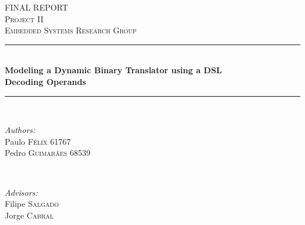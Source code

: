 \documentclass[12pt]{article}
\begin{document}
\begin{titlepage}

\newcommand{\HRule}{\rule{\linewidth}{0.5mm}} %

\center %
 

\textsc{\LARGE FINAL REPORT}\\[1.0cm] %
\textsc{\Large Project II}\\[0.5cm] %
\textsc{\large Embedded Systems Research Group}\\[0.5cm] %


\HRule \\[1.2cm]
{ \Huge \bfseries 
Modeling a Dynamic Binary Translator using a DSL}\\[1.0cm] %
{ \Large \bfseries 
Decoding Operands}\\[0.4cm]

\HRule \\[3.0cm]
 
\begin{minipage}{0.4\textwidth}
\begin{flushleft} \large
\emph{Authors:}\\
Paulo \textsc{Félix} 61767  \\
Pedro \textsc{Guimarães} 68539
\end{flushleft}
\end{minipage}
~
\begin{minipage}{0.4\textwidth}
\begin{flushright} \large
 \emph{Advisors:} \\
Filipe \textsc{Salgado} \\ %
Jorge \textsc{Cabral} %
\end{flushright}
\end{minipage}\\[2cm]


\end{titlepage}
\end{document}
